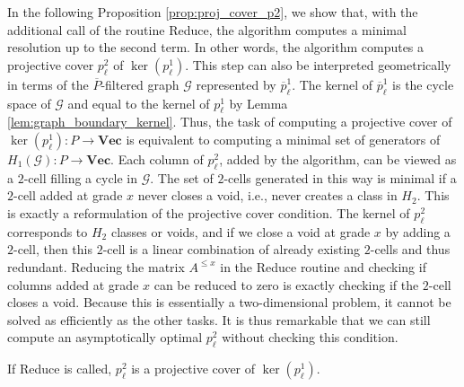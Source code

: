 \documentclass[english,a4paper,nolineno,cleveref]{socg-lipics-v2021}
\begin{document}
\begin{remark}
In the following Proposition \ref{prop:proj_cover_p2}, we show that, with the additional call of the routine {\sc Reduce}, the algorithm computes a minimal resolution up to the second term. In other words, the algorithm computes a projective cover $p_\ell^2$ of $\ker(p_\ell^1)$. This step can also be interpreted geometrically in terms of the $\overline{P}$-filtered graph $\mathcal{G}$ represented by $\overline{p}_\ell^1$. The kernel of $\overline{p}_\ell^1$ is the cycle space of $\mathcal{G}$ and equal to the kernel of $p_\ell^1$ by Lemma \ref{lem:graph_boundary_kernel}. Thus, the task of computing a projective cover of $\ker(p_\ell^1)\colon P\rightarrow \mathbf{Vec}$ is equivalent to computing a minimal set of generators of $H_1(\mathcal{G})\colon P\rightarrow \mathbf{Vec}$. Each column of $p_\ell^2$, added by the algorithm, can be viewed as a $2$-cell filling a cycle in $\mathcal{G}$. The set of $2$-cells generated in this way is minimal if a $2$-cell added at grade $x$ never closes a void, i.e., never creates a class in $H_2$. This is exactly a reformulation of the projective cover condition. The kernel of $p_\ell^2$ corresponds to $H_2$ classes or voids, and if we close a void at grade $x$ by adding a $2$-cell, then this $2$-cell is a linear combination of already existing $2$-cells and thus redundant. Reducing the matrix $A^{\leq x}$ in the {\sc Reduce} routine and checking if columns added at grade $x$ can be reduced to zero is exactly checking if the $2$-cell closes a void. Because this is essentially a two-dimensional problem, it cannot be solved as efficiently as the other tasks. It is thus remarkable that we can still compute an asymptotically optimal $p_\ell^2$ without checking this condition.
\end{remark}

\begin{proposition}\label{prop:proj_cover_p2}
If {\sc Reduce} is called, $p_\ell^2$ is a projective cover of $\ker(p_\ell^1)$.  
\end{proposition}
\end{document}
